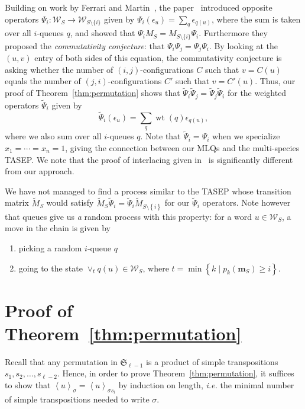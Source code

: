 \documentclass[reqno]{amsart}
\newcommand{\0}{\phantom{c}}
\newcommand{\swt}[1]{\left\langle #1 \right\rangle} %
\newcommand{\merge}[1]{\vee_{#1}} %
\newcommand{\SymGp}[1]{\mathfrak{S}_{#1}} %
\DeclareMathOperator{\wt}{wt} %
\newcommand{\mm}{\mathbf{m}}
\newcommand{\mcW}{\mathcal{W}}
\let\sumnonlimits\sum
\renewcommand{\sum}{\sumnonlimits\limits}
\newcommand{\set}[1]{\left\{ #1 \right\}}
\newcommand{\defn}[1]{{\color{darkred}\emph{#1}}} %
\theoremstyle{plain}
\theoremstyle{definition}
\numberwithin{equation}{section}
\begin{document}
Building on work by Ferrari and Martin~\cite{FM06,FM07}, the paper~\cite{AAMP} introduced opposite operators $\Psi_i \colon \mcW_S \to \mcW_{S \setminus \{i\}}$ given by $\Psi_i(\epsilon_u) = \sum_{q} \epsilon_{q(u)}$, where the sum is taken over all $i$-queues $q$, and showed that $\Psi_i M_S = M_{S \setminus \{i\}} \Psi_i$.
Furthermore they proposed the \defn{commutativity conjecture}: that $\Psi_i \Psi_j = \Psi_j \Psi_i$.
By looking at the $(u,v)$ entry of both sides of this equation, the commutativity conjecture is asking whether the number of $(i,j)$-configurations $C$ such that $v = C(u)$ equals the number of $(j,i)$-configurations $C'$ such that $v = C'(u)$. 
Thus, our proof of Theorem~\ref{thm:permutation} shows that $\widetilde{\Psi}_i \widetilde{\Psi}_j = \widetilde{\Psi}_j \widetilde{\Psi}_i$ for the weighted operators $\widetilde{\Psi}_i$ given by
\[
\widetilde{\Psi}_i(\epsilon_u) = \sum_q \wt(q) \epsilon_{q(u)},
\]
where we also sum over all $i$-queues $q$.
Note that $\widetilde{\Psi}_i = \Psi_i$ when we specialize $x_1 = \cdots = x_n = 1$, giving the connection between our MLQs and the multi-species TASEP.
We note that the proof of interlacing given in~\cite{AAMP} is significantly different from our approach.

We have not managed to find a process similar to the TASEP whose transition matrix $\widetilde{M}_S$ would satisfy $\widetilde{M}_S \widetilde{\Psi}_i = \widetilde{\Psi}_i \widetilde{M}_{S \setminus \set{i}}$ for our $\widetilde{\Psi}_i$ operators.
Note however that queues give us \emph{a} random process with this property: for a word $u \in \mcW_S$, a move in the chain is given by
\begin{enumerate}
\item picking a random $i$-queue $q$
\item going to the state $\merge{t} q(u) \in \mcW_S$, where $t = \min\set{k \mid p_k(\mm_S) \geq i}$.
\end{enumerate}









\section{Proof of Theorem~\ref{thm:permutation}}
\label{sec:thm_proof}

Recall that any permutation in $\SymGp{\ell-1}$ is a product of simple transpositions
$s_1, s_2, \ldots, s_{\ell-2}$.
Hence, in order to prove Theorem~\ref{thm:permutation}, it suffices to show that $\swt{u}_{\sigma} = \swt{u}_{\sigma s_i}$ by induction on length, \textit{i.e.} the minimal number of simple transpositions needed to write $\sigma$.
\end{document}
